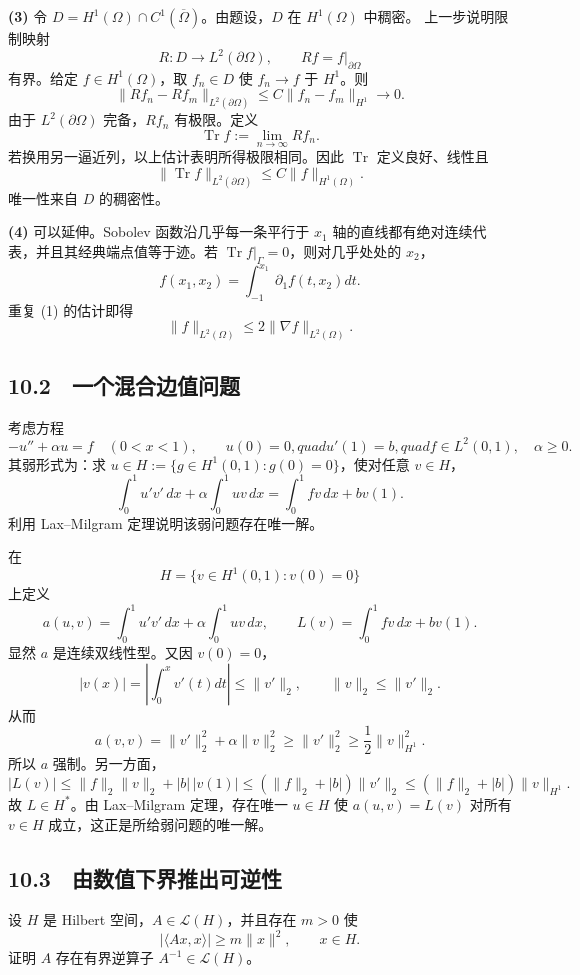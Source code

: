 \textbf{(3)} 令 $D=H^1(\Omega)\cap C^1(\overline\Omega)$。由题设，$D$ 在 $H^1(\Omega)$ 中稠密。
上一步说明限制映射
\[
 R:D\longrightarrow L^2(\partial\Omega),\qquad Rf=f|_{\partial\Omega}
\]
有界。给定 $f\in H^1(\Omega)$，取 $f_n\in D$ 使 $f_n\to f$ 于 $H^1$。则
\[
 \|Rf_n-Rf_m\|_{L^2(\partial\Omega)}\le C\|f_n-f_m\|_{H^1}\to0.
\]
由于 $L^2(\partial\Omega)$ 完备，$Rf_n$ 有极限。定义
\[
 \operatorname{Tr}f:=\lim_{n\to\infty}Rf_n.
\]
若换用另一逼近列，以上估计表明所得极限相同。因此 $\operatorname{Tr}$ 定义良好、线性且
\[
 \|\operatorname{Tr}f\|_{L^2(\partial\Omega)}\le C\|f\|_{H^1(\Omega)}.
\]
唯一性来自 $D$ 的稠密性。

\textbf{(4)} 可以延伸。Sobolev 函数沿几乎每一条平行于 $x_1$ 轴的直线都有绝对连续代表，并且其经典端点值等于迹。若 $\operatorname{Tr}f|_\Gamma=0$，则对几乎处处的 $x_2$，
\[
 f(x_1,x_2)=\int_{-1}^{x_1}\partial_1f(t,x_2)dt.
\]
重复 (1) 的估计即得
\[
 \|f\|_{L^2(\Omega)}\le2\|\nabla f\|_{L^2(\Omega)}.
\]

\subsection*{10.2　一个混合边值问题}

\begin{problem}
考虑方程
\[
 -u''+\alpha u=f\quad (0<x<1),\qquad
 u(0)=0,quad u'(1)=b,quad f\in L^2(0,1),\quad \alpha\ge0.
\]
其弱形式为：求 $u\in H:=\{g\in H^1(0,1):g(0)=0\}$，使对任意 $v\in H$，
\[
 \int_0^1u'v'\,dx+\alpha\int_0^1uv\,dx
 =\int_0^1fv\,dx+bv(1).
\]
利用 Lax--Milgram 定理说明该弱问题存在唯一解。
\end{problem}

在
\[
 H=\{v\in H^1(0,1):v(0)=0\}
\]
上定义
\[
 a(u,v)=\int_0^1u'v'\,dx+\alpha\int_0^1uv\,dx,
 \qquad L(v)=\int_0^1fv\,dx+bv(1).
\]
显然 $a$ 是连续双线性型。又因 $v(0)=0$，
\[
 |v(x)|=\left|\int_0^xv'(t)dt\right|\le\|v'\|_2,
 \qquad \|v\|_2\le\|v'\|_2.
\]
从而
\[
 a(v,v)=\|v'\|_2^2+\alpha\|v\|_2^2
 \ge\|v'\|_2^2\ge\frac12\|v\|_{H^1}^2.
\]
所以 $a$ 强制。另一方面，
\[
 |L(v)|\le\|f\|_2\|v\|_2+|b|\,|v(1)|
 \le(\|f\|_2+|b|)\|v'\|_2
 \le(\|f\|_2+|b|)\|v\|_{H^1}.
\]
故 $L\in H^*$。由 Lax--Milgram 定理，存在唯一 $u\in H$ 使
$a(u,v)=L(v)$ 对所有 $v\in H$ 成立，这正是所给弱问题的唯一解。

\subsection*{10.3　由数值下界推出可逆性}

\begin{problem}
设 $H$ 是 Hilbert 空间，$A\in\mathcal L(H)$，并且存在 $m>0$ 使
\[
 |\langle Ax,x\rangle|\ge m\|x\|^2,\qquad x\in H.
\]
证明 $A$ 存在有界逆算子 $A^{-1}\in\mathcal L(H)$。
\end{problem}


